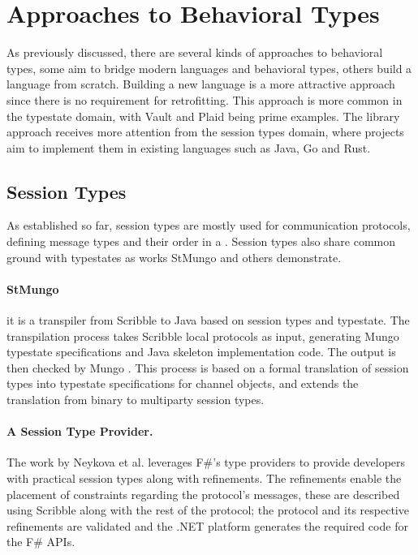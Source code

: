 \section{Approaches to Behavioral Types}\label{sec:behavioral-approaches}

As previously discussed, there are several kinds of approaches to behavioral types,
some aim to bridge modern languages and behavioral types,
others build a language from scratch.
Building a new language is a more attractive approach since there is no requirement for retrofitting.
This approach is more common in the typestate domain, with Vault and Plaid being prime examples.
The library approach receives more attention from the session types domain,
where projects aim to implement them in existing languages such as Java, Go and Rust.

\subsection{Session Types}
As established so far, session types are mostly used for communication protocols,
defining message types and their order in a .
Session types also share common ground with typestates as works StMungo \autocite{Dardha2017, Kouzapas2018, Voinea2020}
and others \autocite{Gay2015, Vasconcelos2017} demonstrate.

\paragraph{StMungo} it is a transpiler from Scribble \autocite{Yoshida2014} to Java based on session types and typestate.
The transpilation process takes Scribble local protocols as input, generating Mungo typestate specifications and Java skeleton implementation code.
The output is then checked by Mungo \autocite{Dardha2017, Kouzapas2018, Voinea2020}.
This process is based on a formal translation of session types into typestate specifications for channel objects, and
extends the translation from binary to multiparty session types.

\paragraph{A Session Type Provider.}
The work by Neykova et al. \autocite{Neykova2018} leverages F\#'s type providers to provide developers with practical session types along with refinements.
The refinements enable the placement of constraints regarding the protocol's messages,
these are described using Scribble \autocite{Yoshida2014} along with the rest of the protocol;
the protocol and its respective refinements are validated and the .NET platform generates the required code for the F\# \gls{API}s.

